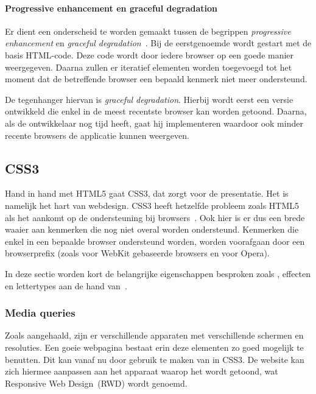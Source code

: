 \paragraph{Progressive enhancement en graceful degradation}
\label{par:progressive-enhancement}
Er dient een onderscheid te worden gemaakt tussen de begrippen \emph{progressive enhancement} en \emph{graceful degradation}~\cite{Hens2012}. 
Bij de eerstgenoemde wordt gestart met de basis HTML-code.
Deze code wordt door iedere browser op een goede manier weergegeven. 
Daarna zullen er iteratief elementen worden toegevoegd tot het moment dat de betreffende browser een bepaald kenmerk niet meer ondersteund.

De tegenhanger hiervan is \emph{graceful degradation}. 
Hierbij wordt eerst een versie ontwikkeld die enkel in de meest recentste browser kan worden getoond. 
Daarna, als de ontwikkelaar nog tijd heeft, gaat hij  implementeren waardoor ook minder recente browsers de applicatie kunnen weergeven.

\subsection{CSS3}
\label{ref:css3}
Hand in hand met HTML5 gaat CSS3, dat zorgt voor de presentatie. 
Het is namelijk het hart van webdesign. 
CSS3 heeft hetzelfde probleem zoals HTML5 als het aankomt op de ondersteuning bij browsers~\cite{MacDonald2011}. 
Ook hier is er dus een brede waaier aan kenmerken die nog niet overal worden ondersteund. 
Kenmerken die enkel in een bepaalde browser ondersteund worden, worden voorafgaan door een browserprefix (zoals  voor WebKit gebaseerde browsers en  voor Opera).

In deze sectie worden kort de belangrijke eigenschappen besproken zoals , effecten en lettertypes aan de hand van~\cite{MacDonald2011}.

\subsubsection{Media queries}
Zoals aangehaald, zijn er verschillende apparaten met verschillende schermen en resoluties. 
Een goeie webpagina bestaat erin deze elementen zo goed mogelijk te benutten. 
Dit kan vanaf nu door gebruik te maken van  in CSS3. 
De website kan zich hiermee aanpassen aan het apparaat waarop het wordt getoond, wat  Responsive Web Design~(RWD) wordt genoemd.

